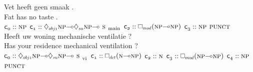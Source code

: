 \begin{exe}
\label{gloss:smain_ta}
\glll Vet heeft geen smaak .\\
Fat has no taste . \\
	$\con{0}::\np[s]$
	$\con{1}::\ddia{obj1}\np[s]\li\ddia{su}\np[s]\li\smain[s]$
	$\con{2}::\dbox{mod}(\np[s]\li\np[s])$
	$\con{3}::\np[s]$
	$\punct[s]$\\
\label{gloss:svi_ta}
\glll Heeft uw woning mechanische ventilatie ?\\
Has your residence mechanical ventilation ?\\
	$\con{0}::\ddia{obj1}\np[s]\li\ddia{su}\np[s]\li\svi[s]$
	$\con{1}::\dbox{det}(\n[s]\li\np[s])$
	$\con{2}::\n[s]$
	$\con{3}::\dbox{mod}(\np[s]\li\np[s])$
	$\con{4}::\np[s]$
	$\punct[s]$\\
\end{exe}

